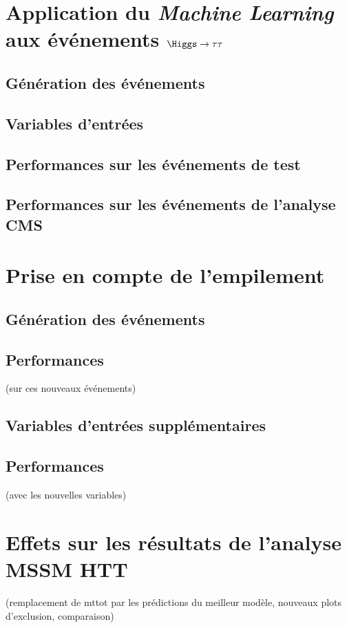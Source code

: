 \section{Application du \emph{Machine Learning} aux événements $\Higgs\to\tau\tau$}
\subsection{Génération des événements}
\subsection{Variables d'entrées}
\subsection{Performances sur les événements de test}
\subsection{Performances sur les événements de l'analyse CMS}

\section{Prise en compte de l'empilement}
\subsection{Génération des événements}
\subsection{Performances} (sur ces nouveaux événements)
\subsection{Variables d'entrées supplémentaires}
\subsection{Performances} (avec les nouvelles variables)

\section{Effets sur les résultats de l'analyse MSSM HTT}
(remplacement de mttot par les prédictions du meilleur modèle, nouveaux plots d'exclusion, comparaison)

